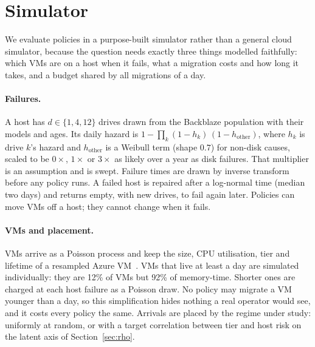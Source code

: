 
\section{Simulator}
\label{sec:sim}

We evaluate policies in a purpose-built simulator rather than a general cloud simulator, because
the question needs exactly three things modelled faithfully: which VMs are on a host when it fails,
what a migration costs and how long it takes, and a budget shared by all migrations of a day.

\paragraph{Failures.}
A host has $d \in \{1, 4, 12\}$ drives drawn from the Backblaze population with their models and
ages. Its daily hazard is $1 - \prod_k (1 - h_k)\,(1 - h_{\text{other}})$, where $h_k$ is drive $k$'s
hazard and $h_{\text{other}}$ is a Weibull term (shape $0.7$) for non-disk causes, scaled to be
$0\times$, $1\times$ or $3\times$ as likely over a year as disk failures. That multiplier is an
assumption and is swept. Failure times are drawn by inverse transform before any policy runs. A
failed host is repaired after a log-normal time (median two days) and returns empty, with new
drives, to fail again later. Policies can move VMs off a host; they cannot change when it fails.

\paragraph{VMs and placement.}
VMs arrive as a Poisson process and keep the size, CPU utilisation, tier and lifetime of a
resampled Azure VM~\cite{cortez2017resource}. VMs that live at least a day are simulated
individually: they are 12\% of VMs but 92\% of memory-time. Shorter ones are charged at each
host failure as a Poisson draw. No policy may migrate a VM younger than a day, so this
simplification hides nothing a real operator would see, and it costs every policy the same.
Arrivals are placed by the regime under study: uniformly at random, or with a target correlation
between tier and host risk on the latent axis of Section~\ref{sec:rho}.

